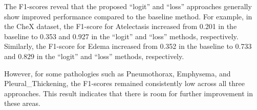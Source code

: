 \documentclass[preprint,3p,times, review]{elsarticle}
\begin{document}
The F1-scores reveal that the proposed ``logit'' and ``loss'' approaches generally show improved performance compared to the baseline method. For example, in the CheX dataset, the F1-score for Atelectasis increased from 0.201 in the baseline to 0.353 and 0.927 in the ``logit'' and ``loss'' methods, respectively. Similarly, the F1-score for Edema increased from 0.352 in the baseline to 0.733 and 0.829 in the ``logit'' and ``loss'' methods, respectively.

However, for some pathologies such as Pneumothorax, Emphysema, and Pleural\_Thickening, the F1-scores remained consistently low across all three approaches. This result indicates that there is room for further improvement in these areas.


\begin{table}[]
\caption{F1-score performance of the three methods (baseline, ``logit'', and ``loss'') on the CheX, NIH, and PC chest radiograph datasets for various pathologies.}
\end{table}
\end{document}
